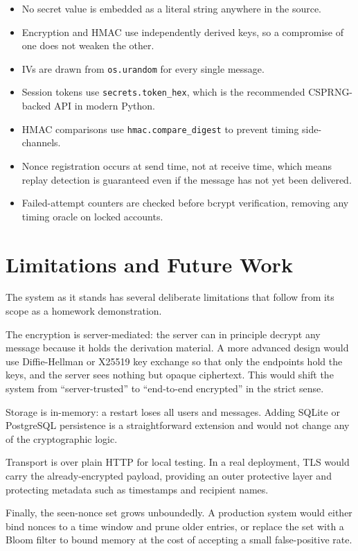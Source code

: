 \documentclass[conference]{IEEEtran}
\begin{document}
\begin{itemize}
    \item No secret value is embedded as a literal string anywhere in the source.
    \item Encryption and HMAC use independently derived keys, so a compromise of one does not weaken the other.
    \item IVs are drawn from \texttt{os.urandom} for every single message.
    \item Session tokens use \texttt{secrets.token\_hex}, which is the recommended CSPRNG-backed API in modern Python.
    \item HMAC comparisons use \texttt{hmac.compare\_digest} to prevent timing side-channels.
    \item Nonce registration occurs at send time, not at receive time, which means replay detection is guaranteed even if the message has not yet been delivered.
    \item Failed-attempt counters are checked before bcrypt verification, removing any timing oracle on locked accounts.
\end{itemize}

\section{Limitations and Future Work}

The system as it stands has several deliberate limitations that follow from its scope as a homework demonstration.

The encryption is server-mediated: the server can in principle decrypt any message because it holds the derivation material. A more advanced design would use Diffie-Hellman or X25519 key exchange so that only the endpoints hold the keys, and the server sees nothing but opaque ciphertext. This would shift the system from ``server-trusted'' to ``end-to-end encrypted'' in the strict sense.

Storage is in-memory: a restart loses all users and messages. Adding SQLite or PostgreSQL persistence is a straightforward extension and would not change any of the cryptographic logic.

Transport is over plain HTTP for local testing. In a real deployment, TLS would carry the already-encrypted payload, providing an outer protective layer and protecting metadata such as timestamps and recipient names.

Finally, the seen-nonce set grows unboundedly. A production system would either bind nonces to a time window and prune older entries, or replace the set with a Bloom filter to bound memory at the cost of accepting a small false-positive rate.
\end{document}
